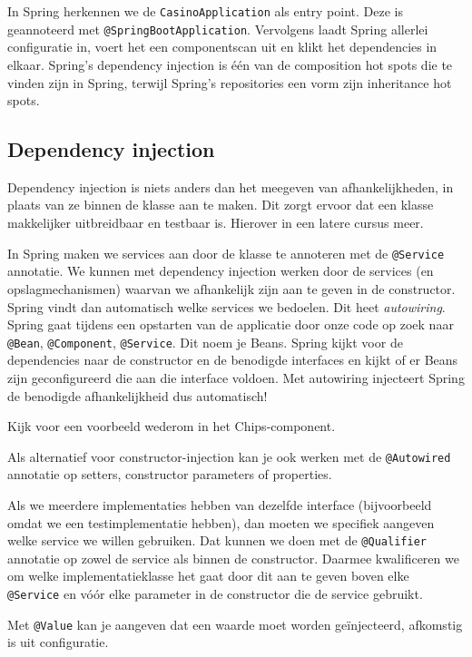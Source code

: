 In Spring herkennen we de \texttt{CasinoApplication} als entry point.
Deze is geannoteerd met \texttt{@SpringBootApplication}. Vervolgens laadt
Spring allerlei configuratie in, voert het een componentscan uit en klikt het dependencies in elkaar.
Spring's dependency injection is één van de composition hot spots die te vinden zijn in Spring,
terwijl Spring's repositories een vorm zijn inheritance hot spots.

\subsection{Dependency injection}
Dependency injection is niets anders dan het meegeven van afhankelijkheden,
in plaats van ze binnen de klasse aan te maken. Dit zorgt ervoor dat een klasse 
makkelijker uitbreidbaar en testbaar is. Hierover in een latere cursus meer.

In Spring maken we services aan door de klasse te annoteren met de \texttt{@Service} annotatie. 
We kunnen met dependency injection werken door de services (en opslagmechanismen) waarvan we afhankelijk zijn 
aan te geven in de constructor. Spring vindt dan automatisch welke services we bedoelen. 
Dit heet \textit{autowiring}.
Spring gaat tijdens een opstarten van de applicatie door onze code op zoek naar 
\texttt{@Bean}, \texttt{@Component}, \texttt{@Service}. Dit noem je Beans. 
Spring kijkt voor de dependencies naar de constructor en de benodigde interfaces 
en kijkt of er Beans zijn geconfigureerd die aan die interface voldoen. Met autowiring 
injecteert Spring de benodigde afhankelijkheid dus automatisch!

Kijk voor een voorbeeld wederom in het Chips-component.

Als alternatief voor constructor-injection kan 
je ook werken met de \texttt{@Autowired} annotatie 
op setters, constructor parameters of properties. 

Als we meerdere implementaties hebben van dezelfde interface 
(bijvoorbeeld omdat we een testimplementatie hebben), 
dan moeten we specifiek aangeven welke service we willen gebruiken. 
Dat kunnen we doen met de \texttt{@Qualifier} annotatie op zowel de service als binnen de constructor. 
Daarmee kwalificeren we om welke implementatieklasse het gaat door 
dit aan te geven boven elke \texttt{@Service} en vóór elke parameter in de 
constructor die de service gebruikt.

Met \texttt{@Value} kan je aangeven dat een waarde moet worden geïnjecteerd,
afkomstig is uit configuratie.

